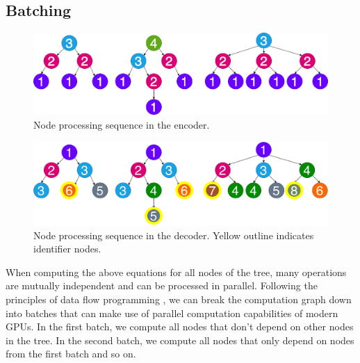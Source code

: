 \newpage
\subsection{Batching}

\begin{figure}
    \centering
    \includegraphics[width=\linewidth]{images/TreeBatchingEncoder.png}
    \caption{Node processing sequence in the encoder.}
    \label{fig:treeBatchingEncoder}
\end{figure}

\begin{figure}
    \centering
    \includegraphics[width=\linewidth]{images/TreeBatchingIdentifiers.pdf}
    \caption{Node processing sequence in the decoder. Yellow outline indicates identifier nodes.}
    \label{fig:treeBatchingDecoder}
\end{figure}

When computing the above equations for all nodes of the tree, many operations are mutually independent and can be processed in parallel.
Following the principles of data flow programming \cite{schwarzkopfRemarkableUtilityDataflow2020}, we can break the computation graph down into batches that can make use of parallel computation capabilities of modern GPUs.
In the first batch, we compute all nodes that don't depend on other nodes in the tree.
In the second batch, we compute all nodes that only depend on nodes from the first batch and so on.

